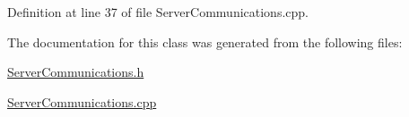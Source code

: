 Definition at line 37 of file Server\+Communications.\+cpp.



The documentation for this class was generated from the following files\+:\begin{DoxyCompactItemize}
\item 
\hyperlink{ServerCommunications_8h}{Server\+Communications.\+h}\item 
\hyperlink{ServerCommunications_8cpp}{Server\+Communications.\+cpp}\end{DoxyCompactItemize}
